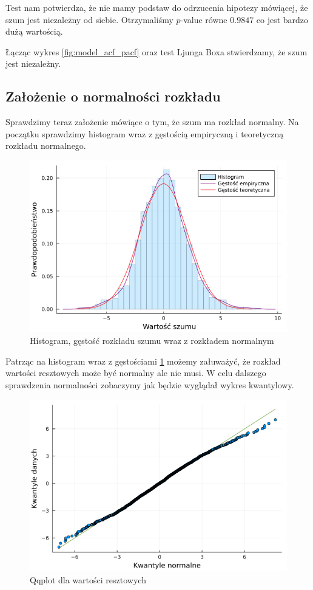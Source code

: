 \documentclass[12pt]{article}
\begin{document}
Test nam potwierdza, że nie mamy podstaw do odrzucenia hipotezy mówiącej, że szum jest niezależny od siebie. Otrzymaliśmy $p$-value równe $0.9847$ co jest bardzo dużą wartością.

Łącząc wykres \ref{fig:model_acf_pacf} oraz test Ljunga Boxa stwierdzamy, że szum jest niezależny.

\subsection{Założenie o normalności rozkładu}
Sprawdzimy teraz założenie mówiące o tym, że szum ma rozkład normalny.
Na początku sprawdzimy histogram wraz z gęstością empiryczną i teoretyczną rozkładu normalnego.
\begin{figure}[H]
	\centering
	\includegraphics[width=3\columnwidth/4]{img/density.png}
	\caption{Histogram, gęstość rozkładu szumu wraz z rozkładem normalnym}
	\label{fig:density}
\end{figure}

Patrząc na histogram wraz z gęstościami \ref{fig:density} możemy załuważyć, że rozkład wartości resztowych może być normalny ale nie musi. W celu dalszego sprawdzenia normalności zobaczymy jak będzie wyglądał wykres kwantylowy.

\begin{figure}[H]
	\centering
	\includegraphics[width=3\columnwidth/4]{img/qqplot.png}
	\caption{Qqplot dla wartości resztowych}
	\label{fig:qqplot}
\end{figure}
\end{document}
